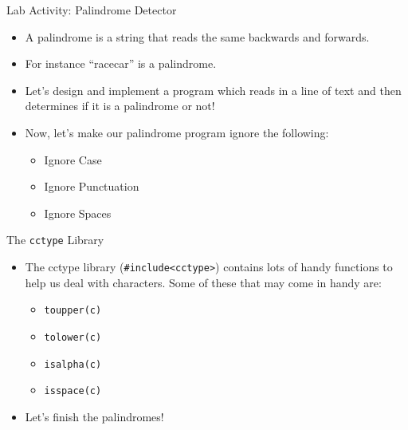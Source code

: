 \documentclass[]{beamer}
\begin{document}
\begin{frame}{Lab Activity: Palindrome Detector}
    \begin{itemize}[<+->]
        \item A palindrome is a string that reads the same backwards
            and forwards.  
        \item For instance ``racecar'' is a palindrome.
        \item Let's design and implement a program which reads in
            a line of text and then determines if it is a palindrome
            or not!
        \item Now, let's make our palindrome program ignore the
            following:
            \begin{itemize}
                \item Ignore Case
                \item Ignore Punctuation
                \item Ignore Spaces
            \end{itemize}
    \end{itemize}
\end{frame}

\begin{frame}{The \texttt{cctype} Library}
    \begin{itemize}[<+->]
        \item The cctype library (\texttt{\#include<cctype>}) contains
            lots of handy functions to help us deal with characters.
            Some of these that may come in handy are:
            \begin{itemize}
                \item \texttt{toupper(c)}
                \item \texttt{tolower(c)}
                \item \texttt{isalpha(c)}
                \item \texttt{isspace(c)}
            \end{itemize}
        \item Let's finish the palindromes!
    \end{itemize}
\end{frame}
\end{document}
